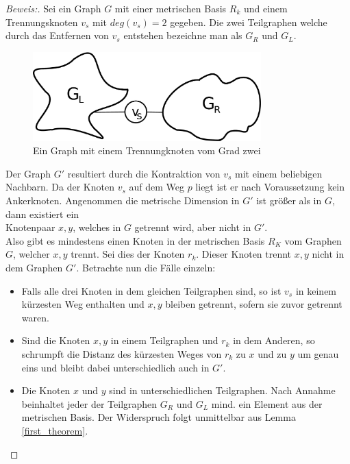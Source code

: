 \begin{proof}[Beweis:]
Sei ein Graph $G$ mit einer metrischen Basis $R_k$ und einem Trennungsknoten $v_s$ mit $deg(v_s)=2$ gegeben. Die zwei Teilgraphen welche durch das Entfernen von $v_s$ entstehen bezeichne man als $G_R$ und $G_L$.
\begin{figure}[ht]
\centering
\includegraphics*[width = 250pt]{bilder/proof4,2.pdf}
\caption{Ein Graph mit einem Trennungknoten vom Grad zwei}
\end{figure}
\newline Der Graph $G'$ resultiert durch die Kontraktion von $v_s$ mit einem beliebigen Nachbarn. Da der Knoten $v_s$ auf dem Weg $p$ liegt ist er nach Voraussetzung kein Ankerknoten.\newline
Angenommen die metrische Dimension in $G'$ ist größer als in $G$, dann existiert ein\\Knotenpaar $x,y$, welches in $G$ getrennt wird, aber nicht in $G'$.\\Also gibt es mindestens einen Knoten in der metrischen Basis $R_K$ vom Graphen $G$, welcher $x,y$ trennt. Sei dies der Knoten $r_k$. Dieser Knoten trennt $x,y$ nicht in dem Graphen $G'$. 
Betrachte nun die Fälle einzeln:
\begin{itemize}
\item Falls alle drei Knoten in dem gleichen Teilgraphen sind, so ist $v_s$ in keinem kürzesten Weg enthalten und $x,y$ bleiben getrennt, sofern sie zuvor getrennt waren.
\item Sind die Knoten $x,y$ in einem Teilgraphen und $r_k$ in dem Anderen, so schrumpft die Distanz des kürzesten Weges von $r_k$ zu $x$ und zu $y$ um genau eins und bleibt dabei unterschiedlich auch in $G'$.
\item Die Knoten $x$ und $y$ sind in unterschiedlichen Teilgraphen. Nach Annahme beinhaltet jeder der Teilgraphen $G_R$ und $G_L$ mind. ein Element aus der metrischen Basis. Der Widerspruch folgt unmittelbar aus Lemma \ref{first_theorem}.
\end{itemize}
\end{proof}
